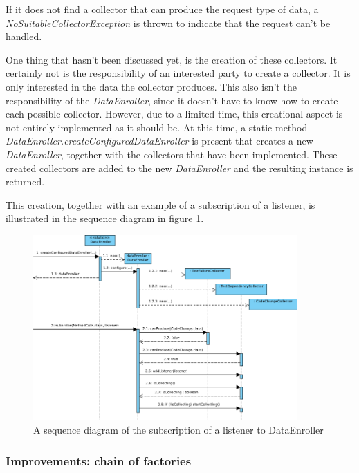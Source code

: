 \documentclass[i2]{oss}
\newcommand{\class}[1]{\emph{#1}}
\newcommand{\method}[1]{\emph{#1}}
\begin{document}
If it does not find a collector that can produce the request type of data, a \class{NoSuitableCollectorException} is thrown to indicate that the request can't be handled.

One thing that hasn't been discussed yet, is the creation of these collectors.
It certainly not is the responsibility of an interested party to create a collector. 
It is only interested in the data the collector produces.
This also isn't the responsibility of the \class{DataEnroller}, since it doesn't have to know how to create each possible collector.
However, due to a limited time, this creational aspect is not entirely implemented as it should be.
At this time, a static method \method{DataEnroller.createConfiguredDataEnroller} is present that creates a new \class{DataEnroller}, together with the collectors that have been implemented.
These created collectors are added to the new \class{DataEnroller} and the resulting instance is returned.

This creation, together with an example of a subscription of a listener, is illustrated in the sequence diagram in figure \ref{fig:sequence:subscribe-collector-listener}.

\begin{figure}[tbp]
\begin{center}
    \includegraphics[width=0.9\textwidth]{SubscribeToDataCollector}
    \caption{A sequence diagram of the subscription of a listener to DataEnroller}
	\label{fig:sequence:subscribe-collector-listener}
\end{center}
\end{figure}

\subsubsection{Improvements: chain of factories}
\end{document}
